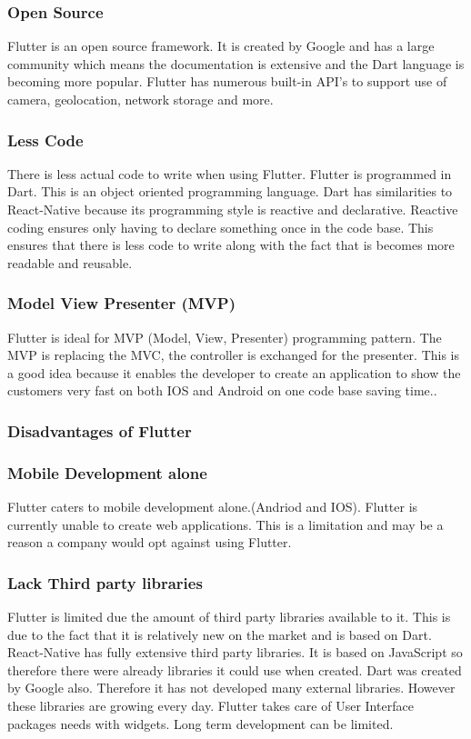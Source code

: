 \subsubsection{Open Source}
Flutter is an open source framework. It is created by Google and has a large community which means the documentation is extensive and the Dart language is becoming more popular. Flutter has numerous built-in API's to support use of camera, geolocation, network storage and more.\cite{pros_cons}
\subsubsection{Less Code}
There is less actual code to write when using Flutter. Flutter is programmed in Dart. This is an object oriented programming language. Dart has similarities to React-Native because its programming style is reactive and declarative.\cite{pros_cons} Reactive coding ensures only having to declare something once in the code base. This ensures that there is less code to write along with the fact that is becomes more readable and reusable.\cite{depth_flutter_2019}
\subsubsection{Model View Presenter (MVP)}
Flutter is ideal for MVP (Model, View, Presenter) programming pattern. The MVP is replacing the MVC, the controller is exchanged for the presenter. This is a good idea because it enables the developer to create an application to show the customers very fast on both IOS and Android on one code base saving time.\cite{pros_cons}.

\subsubsection{Disadvantages of Flutter}

\subsubsection{Mobile Development alone}
Flutter caters to mobile development alone.(Andriod and IOS). Flutter is currently unable to create web applications. This is a limitation and may be a reason a company would opt against using Flutter.

\subsubsection{Lack Third party libraries}
Flutter is limited due the amount of third party libraries available to it. This is due to the fact that it is relatively new on the market and is based on Dart.\cite{pros_cons} React-Native has fully extensive third party libraries. It is based on JavaScript so therefore there were already libraries it could use when created. Dart was created by Google also. Therefore it has not developed many external libraries. However these libraries are growing every day. Flutter takes care of User Interface packages needs with widgets. Long term development can be limited.\cite{good_bad}


